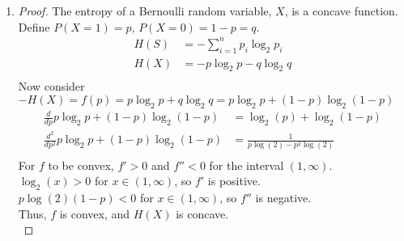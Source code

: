 \documentclass[12pt]{article}
\begin{document}
\begin{enumerate}
\begin{enumerate}
\begin{proof}
          hypothesis and decision tree.
        \end{proof}
    \end{enumerate}
  \item
    \begin{proof} The entropy of a Bernoulli random variable, $X$, is a concave function.\\
      Define $P(X = 1) = p$, $P(X = 0) = 1 - p = q$.\\
      \begin{equation}
        \begin{split}
          H(S)&=-\sum_{i=1}^{n}p_i\log_2p_i \\
          H(X)&=- p\log_2 p - q\log_2 q\\
        \end{split}
      \end{equation}
      Now consider $-H(X) = f(p) = p\log_2p + q\log_2q = p\log_2p + (1-p)\log_2(1-p)$\\
      \begin{equation}
        \begin{split}
          \frac{d}{dp}p\log_2p+(1-p)\log_2(1-p)&=\log_2(p)+\log_2(1-p) \\
          \frac{d^2}{dp^2}p\log_2p+(1-p)\log_2(1-p)&=\frac{1}{p\log(2)-p^2\log(2)} \\
        \end{split}
      \end{equation}
      For $f$ to be convex, $f'>0$ and $f''<0$ for the interval $(1,\infty)$.\\
      $\log_2(x)> 0$ for $x\in(1,\infty)$, so $f'$ is positive.\\
      $p\log(2)(1-p)<0$ for $x\in(1,\infty)$, so $f''$ is negative.\\
      Thus, $f$ is convex, and $H(X)$ is concave.\\
    \end{proof}
\end{enumerate}
\end{document}
